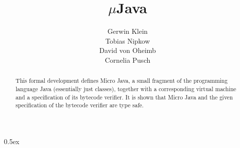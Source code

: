 \documentclass[11pt,a4paper]{article}
\begin{document}
\title{$\mu$Java}
\author{Gerwin Klein \\ Tobias Nipkow \\ David von Oheimb \\ Cornelia Pusch}
\maketitle

\begin{abstract}
  This formal development defines Micro Java, a small fragment of the
  programming language Java (essentially just classes), together with a
  corresponding virtual machine and a specification of its bytecode verifier.
  It is shown that Micro Java and the given specification of the bytecode
  verifier are type safe.
\end{abstract}

\tableofcontents
\parindent 0pt \parskip 0.5ex

\newpage


\nocite{*}


\end{document}
